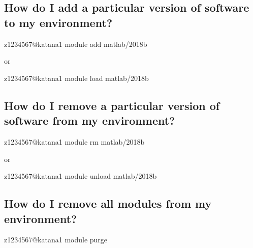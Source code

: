 \documentclass[letterpaper,10pt,english]{sphinxmanual}
\begin{document}
\subsection{How do I add a particular version of software to my environment?}
\label{\detokenize{software/environment_modules:how-do-i-add-a-particular-version-of-software-to-my-environment}}
\begin{sphinxVerbatim}[commandchars=\\\{\}]
\PYG{o}{[}z1234567@katana1 \PYGZti{}\PYG{o}{]}\PYGZdl{} module add matlab/2018b
\end{sphinxVerbatim}

or

\begin{sphinxVerbatim}[commandchars=\\\{\}]
\PYG{o}{[}z1234567@katana1 \PYGZti{}\PYG{o}{]}\PYGZdl{} module load matlab/2018b
\end{sphinxVerbatim}


\subsection{How do I remove a particular version of software from my environment?}
\label{\detokenize{software/environment_modules:how-do-i-remove-a-particular-version-of-software-from-my-environment}}
\begin{sphinxVerbatim}[commandchars=\\\{\}]
\PYG{o}{[}z1234567@katana1 \PYGZti{}\PYG{o}{]}\PYGZdl{} module rm matlab/2018b
\end{sphinxVerbatim}

or

\begin{sphinxVerbatim}[commandchars=\\\{\}]
\PYG{o}{[}z1234567@katana1 \PYGZti{}\PYG{o}{]}\PYGZdl{} module unload matlab/2018b
\end{sphinxVerbatim}


\subsection{How do I remove all modules from my environment?}
\label{\detokenize{software/environment_modules:how-do-i-remove-all-modules-from-my-environment}}
\begin{sphinxVerbatim}[commandchars=\\\{\}]
\PYG{o}{[}z1234567@katana1 \PYGZti{}\PYG{o}{]}\PYGZdl{} module purge
\end{sphinxVerbatim}
\end{document}
